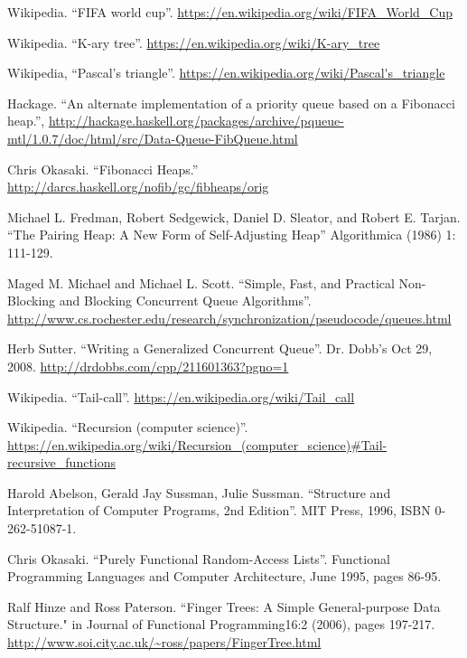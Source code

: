 \begin{thebibliography}{99}
Wikipedia. ``FIFA world cup''. \url{https://en.wikipedia.org/wiki/FIFA_World_Cup}

Wikipedia. ``K-ary tree''. \url{https://en.wikipedia.org/wiki/K-ary_tree}

Wikipedia, ``Pascal's triangle''. \url{https://en.wikipedia.org/wiki/Pascal's_triangle}

Hackage. ``An alternate implementation of a priority queue based on a Fibonacci heap.'', \url{http://hackage.haskell.org/packages/archive/pqueue-mtl/1.0.7/doc/html/src/Data-Queue-FibQueue.html}

Chris Okasaki. ``Fibonacci Heaps.'' \url{http://darcs.haskell.org/nofib/gc/fibheaps/orig}

Michael L. Fredman, Robert Sedgewick, Daniel D. Sleator, and Robert E. Tarjan. ``The Pairing Heap: A New Form of Self-Adjusting Heap'' Algorithmica (1986) 1: 111-129.

Maged M. Michael and Michael L. Scott. ``Simple, Fast, and Practical Non-Blocking and Blocking Concurrent Queue Algorithms''. \url{http://www.cs.rochester.edu/research/synchronization/pseudocode/queues.html}

Herb Sutter. ``Writing a Generalized Concurrent Queue''. Dr. Dobb's Oct 29, 2008. \url{http://drdobbs.com/cpp/211601363?pgno=1}

Wikipedia. ``Tail-call''. \url{https://en.wikipedia.org/wiki/Tail_call}

Wikipedia. ``Recursion (computer science)''. \url{https://en.wikipedia.org/wiki/Recursion_(computer_science)#Tail-recursive_functions}

Harold Abelson, Gerald Jay Sussman, Julie Sussman. ``Structure and Interpretation of Computer Programs, 2nd Edition''. MIT Press, 1996, ISBN 0-262-51087-1.


Chris Okasaki. ``Purely Functional Random-Access Lists''. Functional Programming Languages and Computer Architecture, June 1995, pages 86-95.

Ralf Hinze and Ross Paterson. ``Finger Trees: A Simple General-purpose Data Structure." in Journal of Functional Programming16:2 (2006), pages 197-217. \url{http://www.soi.city.ac.uk/~ross/papers/FingerTree.html}


\end{thebibliography}
